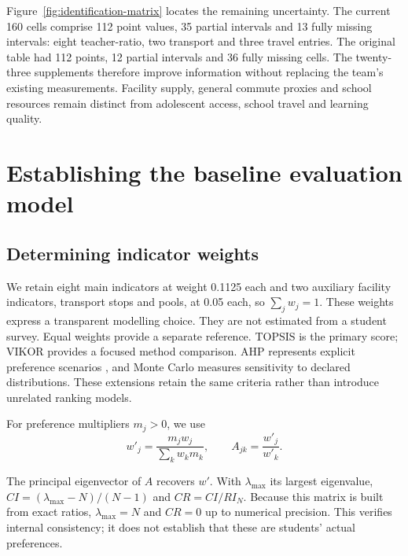 Figure~\ref{fig:identification-matrix} locates the remaining uncertainty.
The current 160 cells comprise 112 point values, 35 partial intervals and
13 fully missing intervals: eight teacher-ratio, two transport and three
travel entries. The original table had 112 points, 12 partial
intervals and 36 fully missing cells. The twenty-three supplements therefore improve
information without replacing the team's existing measurements. Facility supply,
general commute proxies and school resources remain distinct from adolescent
access, school travel and learning quality.



\section{Establishing the baseline evaluation model}
\subsection{Determining indicator weights}
We retain eight main indicators at weight 0.1125 each and two auxiliary facility
indicators, transport stops and pools, at 0.05 each, so $\sum_jw_j=1$.
These weights express a transparent modelling choice. They are not estimated
from a student survey. Equal weights provide a separate reference.
TOPSIS is the primary score; VIKOR provides a focused method comparison.
AHP represents explicit preference scenarios \cite{saaty}, and Monte Carlo measures
sensitivity to declared distributions. These extensions retain the same
criteria rather than introduce unrelated ranking models.

For preference multipliers $m_j>0$, we use
\begin{equation}
 w'_j=\frac{m_jw_j}{\sum_kw_km_k},\qquad A_{jk}=\frac{w'_j}{w'_k}.
 \label{eq:weights}
\end{equation}
\begin{samepage}
The principal eigenvector of $A$ recovers $w'$. With $\lambda_{\max}$ its
largest eigenvalue, $CI=(\lambda_{\max}-N)/(N-1)$ and $CR=CI/RI_N$.
Because this matrix is built from exact ratios, $\lambda_{\max}=N$ and
$CR=0$ up to numerical precision. This verifies internal consistency;
it does not establish that these are students' actual preferences.
\par\end{samepage}

